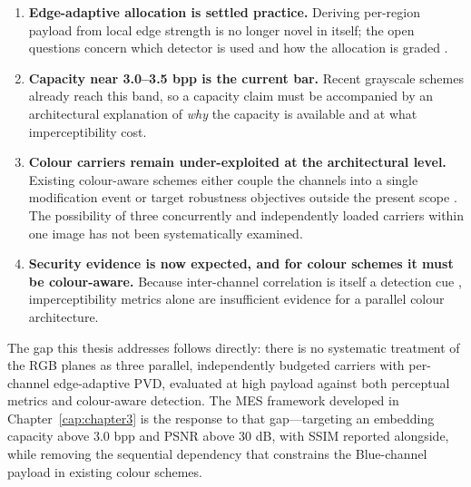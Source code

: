 \begin{enumerate}
    \item \textbf{Edge-adaptive allocation is settled practice.} Deriving per-region payload from local edge strength is no longer novel in itself; the open questions concern which detector is used and how the allocation is graded \citep{ismail2026edgeadaptive, patwari2025dilatedlog, singh2026edgeopt}.
    \item \textbf{Capacity near 3.0--3.5 bpp is the current bar.} Recent grayscale schemes already reach this band, so a capacity claim must be accompanied by an architectural explanation of \textit{why} the capacity is available and at what imperceptibility cost.
    \item \textbf{Colour carriers remain under-exploited at the architectural level.} Existing colour-aware schemes either couple the channels into a single modification event \citep{aljburi2026emd3d} or target robustness objectives outside the present scope \citep{li2025colorconversion}. The possibility of three concurrently and independently loaded carriers within one image has not been systematically examined.
    \item \textbf{Security evidence is now expected, and for colour schemes it must be colour-aware.} Because inter-channel correlation is itself a detection cue \citep{amrutha2023rgbsteganalysis}, imperceptibility metrics alone are insufficient evidence for a parallel colour architecture.
\end{enumerate}

The gap this thesis addresses follows directly: there is no systematic treatment of the RGB planes as three parallel, independently budgeted carriers with per-channel edge-adaptive PVD, evaluated at high payload against both perceptual metrics and colour-aware detection. The MES framework developed in Chapter~\ref{cap:chapter3} is the response to that gap---targeting an embedding capacity above 3.0 bpp and PSNR above 30 dB, with SSIM reported alongside, while removing the sequential dependency that constrains the Blue-channel payload in existing colour schemes.
